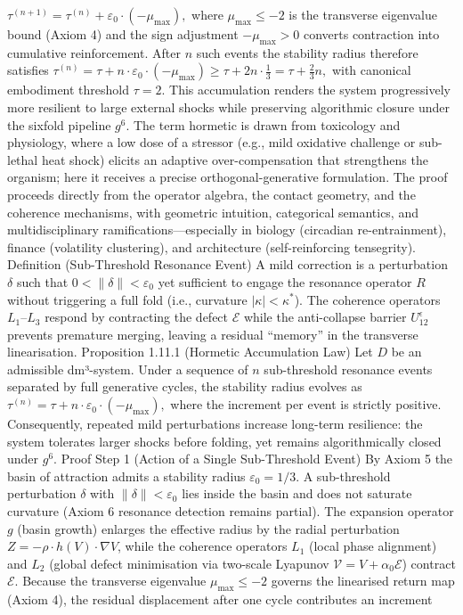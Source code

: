 $   \tau^{(n+1)} = \tau^{(n)} + \varepsilon_0 \cdot (-\mu_{\max}),   $
where $  \mu_{\max} \le -2  $ is the transverse eigenvalue bound (Axiom 4) and the sign adjustment $  -\mu_{\max} > 0  $ converts contraction into cumulative reinforcement. After $  n  $ such events the stability radius therefore satisfies
$   \tau^{(n)} = \tau + n \cdot \varepsilon_0 \cdot (-\mu_{\max}) \ge \tau + 2n \cdot \frac13 = \tau + \frac23 n,   $
with canonical embodiment threshold $  \tau = 2  $. This accumulation renders the system progressively more resilient to large external shocks while preserving algorithmic closure under the sixfold pipeline $  g^6  $. The term hormetic is drawn from toxicology and physiology, where a low dose of a stressor (e.g., mild oxidative challenge or sub-lethal heat shock) elicits an adaptive over-compensation that strengthens the organism; here it receives a precise orthogonal-generative formulation. The proof proceeds directly from the operator algebra, the contact geometry, and the coherence mechanisms, with geometric intuition, categorical semantics, and multidisciplinary ramifications—especially in biology (circadian re-entrainment), finance (volatility clustering), and architecture (self-reinforcing tensegrity).
Definition (Sub-Threshold Resonance Event)
A mild correction is a perturbation $  \delta  $ such that $  0 < \|\delta\| < \varepsilon_0  $ yet sufficient to engage the resonance operator $  R  $ without triggering a full fold (i.e., curvature $  |\kappa| < \kappa^*  $). The coherence operators $  L_1  $–$  L_3  $ respond by contracting the defect $  \mathcal{E}  $ while the anti-collapse barrier $  U_{12}^\epsilon  $ prevents premature merging, leaving a residual “memory” in the transverse linearisation.
Proposition 1.11.1 (Hormetic Accumulation Law)
Let $  D  $ be an admissible dm³-system. Under a sequence of $  n  $ sub-threshold resonance events separated by full generative cycles, the stability radius evolves as
$   \tau^{(n)} = \tau + n \cdot \varepsilon_0 \cdot (-\mu_{\max}),   $
where the increment per event is strictly positive. Consequently, repeated mild perturbations increase long-term resilience: the system tolerates larger shocks before folding, yet remains algorithmically closed under $  g^6  $.
Proof
Step 1 (Action of a Single Sub-Threshold Event)
By Axiom 5 the basin of attraction admits a stability radius $  \varepsilon_0 = 1/3  $. A sub-threshold perturbation $  \delta  $ with $  \|\delta\| < \varepsilon_0  $ lies inside the basin and does not saturate curvature (Axiom 6 resonance detection remains partial). The expansion operator $  g  $ (basin growth) enlarges the effective radius by the radial perturbation $  Z = -\rho \cdot h(V) \cdot \nabla V  $, while the coherence operators $  L_1  $ (local phase alignment) and $  L_2  $ (global defect minimisation via two-scale Lyapunov $  \mathcal{V} = V + \alpha_0 \mathcal{E}  $) contract $  \mathcal{E}  $. Because the transverse eigenvalue $  \mu_{\max} \le -2  $ governs the linearised return map (Axiom 4), the residual displacement after one cycle contributes an increment
